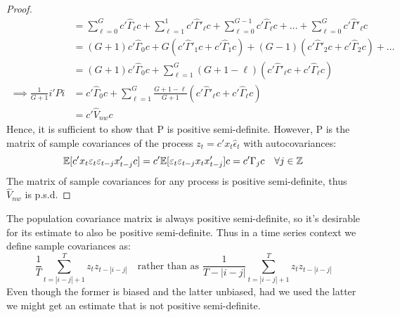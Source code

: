 \documentclass[DIV=14,titlepage=false]{scrreprt}
\begin{document}
\begin{proof}
\begin{align*}
    &= \sum_{{\ell}=0}^{G}c' \hat\Gamma_{\ell} c + \sum_{{\ell}=1}^{1}c' \hat\Gamma'_{\ell} c+ \sum_{{\ell}=0}^{G-1}c' \hat\Gamma_{\ell} c + \dots + \sum_{{\ell}=0}^{G}c' \hat\Gamma'_{\ell} c \\
    &= (G+1)c' \hat\Gamma_0 c + G(c' \hat\Gamma'_1c + c' \hat\Gamma_1c) + (G-1)(c' \hat\Gamma'_2c + c' \hat\Gamma_2c) + \dots\\
    &= (G+1)c' \hat\Gamma_0 c + \sum_{{\ell}=1}^{G}(G+1-{\ell})(c' \hat\Gamma'_{\ell}c + c' \hat\Gamma_{\ell}c)\\
    \implies \frac{1}{G+1}i'Pi &= c' \hat\Gamma_0 c + \sum_{{\ell}=1}^{G}\frac{G+1-{\ell}}{G+1}(c' \hat\Gamma'_{\ell}c + c' \hat\Gamma_{\ell}c)\\
    &= c'\hat V_{nw}c
\end{align*}
Hence, it is sufficient to show that P is positive semi-definite. However, P is the matrix of sample covariances of the process $z_t=c'x_t\hat\epsilon_t$ with autocovariances:
\[\mathbb{E}[c'x_t\varepsilon_t \varepsilon_{t-j} x_{t-j}'c]=c'\mathbb{E}[\varepsilon_t \varepsilon_{t-j}x_t x_{t-j}']c= c'\Gamma_jc \quad \forall j\in\mathbb{Z}\]
The matrix of sample covariances for any process is positive semi-definite, thus $\hat V_{nw}$ is p.s.d.
\end{proof}
\begin{note}
    The population covariance matrix is always positive semi-definite, so it's desirable for its estimate to also be positive semi-definite. Thus in a time series context we define sample covariances as: 
    \[
    \frac{1}{T} \sum_{t=|i-j|+1}^{T} z_tz_{t-|i-j|}\quad \text{rather than as } \frac{1}{T-|i-j|} \sum_{t=|i-j|+1}^{T} z_tz_{t-|i-j|}
    \]
    Even though the former is biased and the latter unbiased, had we used the latter we might get an estimate that is not positive semi-definite.
\end{note}
\end{document}
